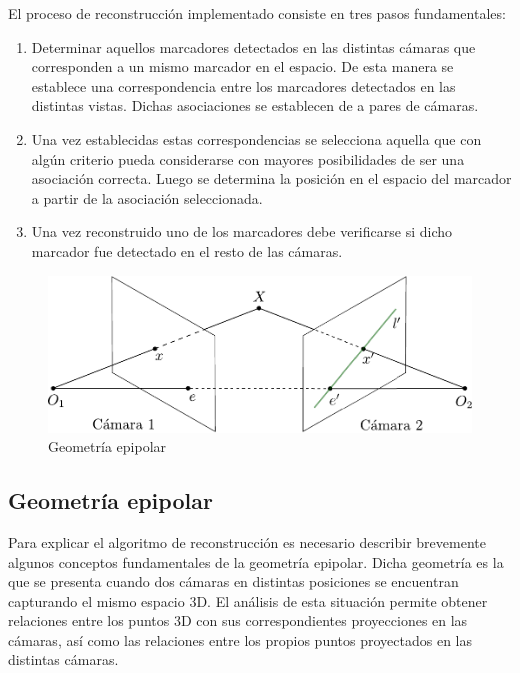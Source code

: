 El proceso de reconstrucción implementado consiste en tres pasos fundamentales:
\begin{enumerate}
\item Determinar aquellos marcadores detectados en las distintas cámaras que corresponden a un mismo marcador en el espacio. De esta manera se establece una correspondencia entre los marcadores detectados en las distintas vistas. Dichas asociaciones se establecen de a pares de cámaras.
\item Una vez establecidas estas correspondencias se selecciona aquella que con algún criterio pueda considerarse con mayores posibilidades de ser una asociación correcta. Luego se determina la posición en el espacio del marcador a partir de la asociación seleccionada.
\item Una vez reconstruido uno de los marcadores debe verificarse si dicho marcador fue detectado en el resto de las cámaras.
\end{enumerate}
\begin{figure}[H]
\begin{center}
\includegraphics[scale=0.7]{img/Reconstruccion/geometria_epipolar.pdf}
\end{center}
\caption{Geometría epipolar}
\label{fig: geometria_epipolar}
\end{figure}

\subsection{Geometría epipolar}



Para explicar el algoritmo de reconstrucción es necesario describir brevemente algunos conceptos fundamentales de la geometría epipolar.  Dicha geometría es la que se presenta cuando dos cámaras en distintas posiciones se encuentran capturando el mismo espacio 3D. El análisis de esta situación permite obtener relaciones entre los puntos 3D con sus correspondientes proyecciones en las cámaras, así como las relaciones entre los propios puntos proyectados en las distintas cámaras\cite{cyganek}\cite{hartley}. \\

